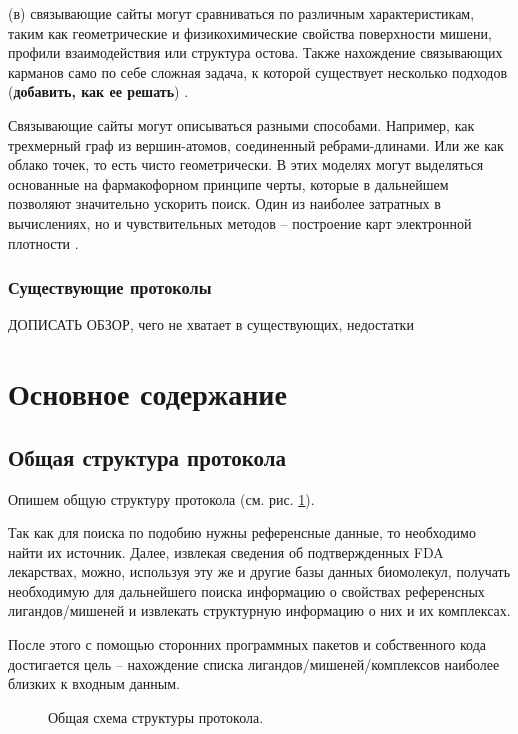\documentclass[a4paper,14pt]{article}         %
\begin{document}
(в) связывающие сайты могут сравниваться по различным характеристикам, таким как геометрические и физикохимические свойства поверхности мишени, профили взаимодействия или структура остова. Также нахождение связывающих карманов само по себе сложная задача, к которой существует несколько подходов (\textbf{добавить, как ее решать}) \cite{Ehrt2016}. 

Связывающие сайты могут описываться разными способами. Например, как трехмерный граф из вершин-атомов, соединенный ребрами-длинами. Или же как облако точек, то есть чисто геометрически. В этих моделях могут выделяться основанные на фармакофорном принципе черты, которые в дальнейшем позволяют значительно ускорить поиск. Один из наиболее затратных в вычислениях, но и чувствительных методов -- построение карт электронной плотности \cite{Ehrt2016}.
\subsubsection{Существующие протоколы}
\color{orange} ДОПИСАТЬ ОБЗОР, чего не хватает в существующих, недостатки\cite{Chartier2017}
\color{black}


\newpage
\section{Основное содержание}
\subsection{Общая структура протокола}
Опишем общую структуру протокола (см. рис. \ref{structure}).

Так как для поиска по подобию нужны референсные данные, то необходимо найти их источник. Далее, извлекая сведения об подтвержденных FDA лекарствах, можно, используя эту же и другие базы данных биомолекул, получать необходимую для дальнейшего поиска информацию о свойствах референсных лигандов/мишеней и извлекать структурную информацию о них и их комплексах.

После этого с помощью сторонних программных пакетов и собственного кода достигается цель -- нахождение списка лигандов/мишеней/комплексов наиболее близких к входным данным.


\begin{figure}
	\begin{minipage}[!ht]{1\linewidth}
		\caption{Общая схема структуры протокола.}
		\label{structure}
	\end{minipage}
\end{figure}
\end{document}
